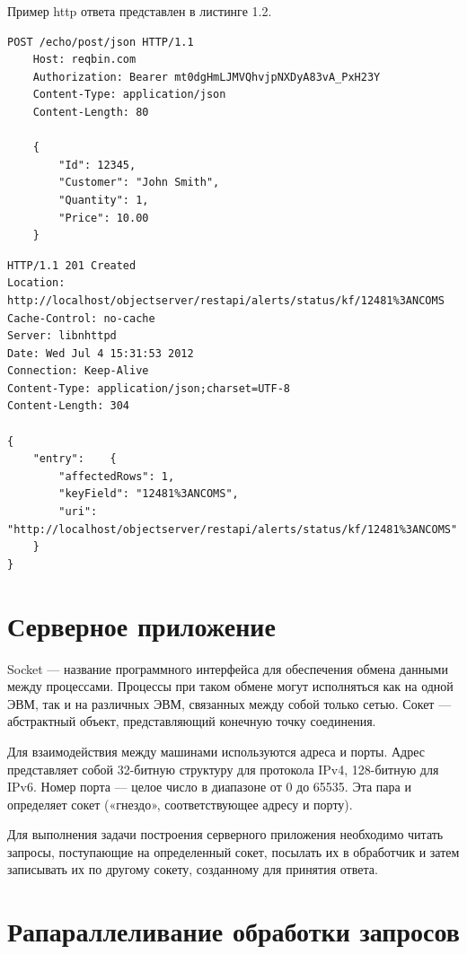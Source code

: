 Пример http ответа представлен в листинге 1.2.

\begin{lstlisting}[caption=Пример http запроса]
	POST /echo/post/json HTTP/1.1
	Host: reqbin.com
	Authorization: Bearer mt0dgHmLJMVQhvjpNXDyA83vA_PxH23Y
	Content-Type: application/json
	Content-Length: 80
	
	{
		"Id": 12345,
		"Customer": "John Smith",
		"Quantity": 1,
		"Price": 10.00
	}
\end{lstlisting}

\pagebreak

\begin{lstlisting}[caption=Пример http ответа]
HTTP/1.1 201 Created
Location: http://localhost/objectserver/restapi/alerts/status/kf/12481%3ANCOMS
Cache-Control: no-cache
Server: libnhttpd
Date: Wed Jul 4 15:31:53 2012
Connection: Keep-Alive
Content-Type: application/json;charset=UTF-8
Content-Length: 304

{
	"entry":	{
		"affectedRows": 1,
		"keyField": "12481%3ANCOMS",
		"uri": "http://localhost/objectserver/restapi/alerts/status/kf/12481%3ANCOMS"
	}
}
\end{lstlisting}


\section{Серверное приложение}

Socket — название программного интерфейса для обеспечения обмена данными между процессами. Процессы при таком обмене могут исполняться как на одной ЭВМ, так и на различных ЭВМ, связанных между собой только сетью. Сокет — абстрактный объект, представляющий конечную точку соединения.

Для взаимодействия между машинами используются адреса и порты. Адрес представляет собой 32-битную структуру для протокола IPv4, 128-битную для IPv6. Номер порта — целое число в диапазоне от 0 до 65535. Эта пара и определяет сокет («гнездо», соответствующее адресу и порту).

Для выполнения задачи построения серверного приложения необходимо читать запросы, поступающие на определенный сокет, посылать их в обработчик и затем записывать их по другому сокету, созданному для принятия ответа.

\section{Рапараллеливание обработки запросов}

